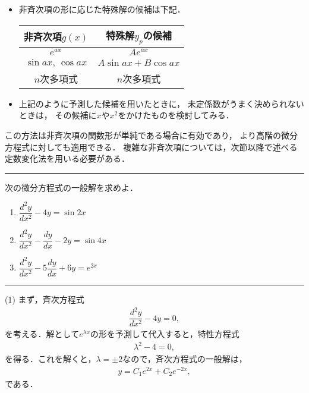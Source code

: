 \begin{itemize}
  \item 非斉次項の形に応じた特殊解の候補は下記． 
  \begin{table}[htbp]
  \centering
  \begin{tabular}{cc}
  \hline
  \hline
  非斉次項$g\left(x\right)$ & 特殊解$y_{p}$の候補\tabularnewline
  \hline 
  $e^{ax}$ & $Ae^{ax}$\tabularnewline
  $\sin ax,\,\cos ax$ & $A\sin ax+B\cos ax$\tabularnewline
  $n$次多項式 & $n$次多項式\tabularnewline
  \hline 
  \end{tabular}
  \end{table}
  \item 上記のように予測した候補を用いたときに，
	未定係数がうまく決められないときは，
	その候補に$x$や$x^2$をかけたものを検討してみる．
\end{itemize}
この方法は非斉次項の関数形が単純である場合に有効であり，
より高階の微分方程式に対しても適用できる．
複雑な非斉次項については，次節以降で述べる定数変化法を用いる必要がある．
%
\newpage
%
\hrule
\reidai
次の微分方程式の一般解を求めよ．
\begin{enumerate}[(1)]
  \item $\dfrac{d^2 y}{dx^2} - 4y = \sin 2x$
  \item $\dfrac{d^2 y}{dx^2} - \dfrac{dy}{dx} - 2 y = \sin 4x$
  \item $\dfrac{d^2 y}{dx^2} -5\dfrac{dy}{dx} + 6 y = e^{2x}$ 
\end{enumerate}
\hrule
\vspace*{.2cm}

\noindent
(1) まず，斉次方程式
\begin{align}
  \dfrac{d^2 y}{dx^2} - 4y = 0,
\end{align}
を考える．解として$e^{\lambda x}$の形を予測して代入すると，特性方程式
\begin{align}
  \lambda^2 - 4 = 0, 
\end{align}
を得る．これを解くと，$\lambda = \pm 2$なので，斉次方程式の一般解は，
\begin{align}
  y = C_1 e^{2x} + C_2 e^{-2x}, 
\end{align}
である．

